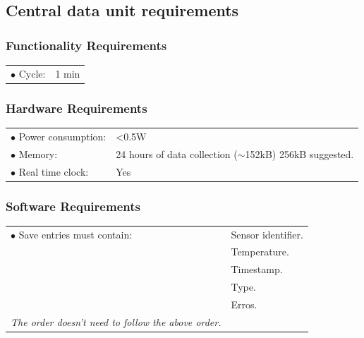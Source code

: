 \subsection{Central data unit requirements}

\subsubsection{Functionality Requirements}
\begin{table}[H]
\begin{tabular}{p{8cm} p{2cm}}
$\bullet$ Cycle\footnotemark: & 1 min\\
\end{tabular}
\end{table}
\subsubsection{Hardware Requirements}
\begin{table}[H]
\begin{tabular}{p{8cm} p{5cm}}
$\bullet$ Power consumption: & <0.5W \footnotemark \\
$\bullet$ Memory: & 24 hours of data collection ($\sim$152kB) 256kB suggested.\\
$\bullet$ Real time clock: & Yes\\
\end{tabular}
\end{table}


\subsubsection{Software Requirements}
\begin{table}[H]
\begin{tabular}{p{8cm} p{5cm}}
$\bullet$ Save entries must contain: &Sensor identifier. \\
~ 									&Temperature. \\
~									&Timestamp. \\
~									&Type. \\
~									&Erros. \\
\textit{The order doesn't need to follow the above order.}

\end{tabular}
\end{table}


